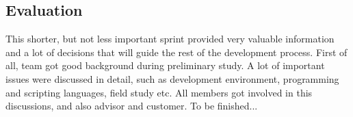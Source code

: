 \subsection{Evaluation}
	This shorter, but not less important sprint provided very valuable information and a lot of decisions that will guide the rest of the development process. First of all, team got good background during preliminary study. A lot of important issues were discussed in detail, such as development environment, programming and scripting languages, field study etc. All members got involved in this discussions, and also advisor and customer. 
	To be finished...
